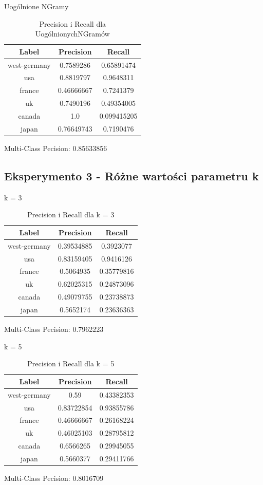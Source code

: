\documentclass{classrep}
\begin{document}
Uogólnione NGramy
\begin{table}[H]
\begin{tabular}{|c|c|c|}
\hline
Label        & Precision  & Recall      \\ \hline
west-germany & 0.7589286  & 0.65891474  \\ \hline
usa          & 0.8819797  & 0.9648311   \\ \hline
france       & 0.46666667 & 0.7241379   \\ \hline
uk           & 0.7490196  & 0.49354005  \\ \hline
canada       & 1.0        & 0.099415205 \\ \hline
japan        & 0.76649743 & 0.7190476   \\ \hline
\end{tabular}
\caption{Precision i Recall dla UogólnionychNGramów}
\end{table}
Multi-Class Pecision: 0.85633856

\subsection{Eksperymento 3 - Różne wartości parametru k}
k = 3
\begin{table}[H]
\begin{tabular}{|c|c|c|}
\hline
Label        & Precision  & Recall     \\ \hline
west-germany & 0.39534885 & 0.3923077  \\ \hline
usa          & 0.83159405 & 0.9416126  \\ \hline
france       & 0.5064935  & 0.35779816 \\ \hline
uk           & 0.62025315 & 0.24873096 \\ \hline
canada       & 0.49079755 & 0.23738873 \\ \hline
japan        & 0.5652174  & 0.23636363 \\ \hline
\end{tabular}
\caption{Precision i Recall dla k = 3}
\end{table}
Multi-Class Pecision: 0.7962223

k = 5
\begin{table}[H]
\begin{tabular}{|c|c|c|}
\hline
Label        & Precision  & Recall     \\ \hline
west-germany & 0.59       & 0.43382353 \\ \hline
usa          & 0.83722854 & 0.93855786 \\ \hline
france       & 0.46666667 & 0.26168224 \\ \hline
uk           & 0.46025103 & 0.28795812 \\ \hline
canada       & 0.6566265  & 0.29945055 \\ \hline
japan        & 0.5660377  & 0.29411766 \\ \hline
\end{tabular}
\caption{Precision i Recall dla k = 5}
\end{table}
Multi-Class Pecision: 0.8016709
\end{document}
